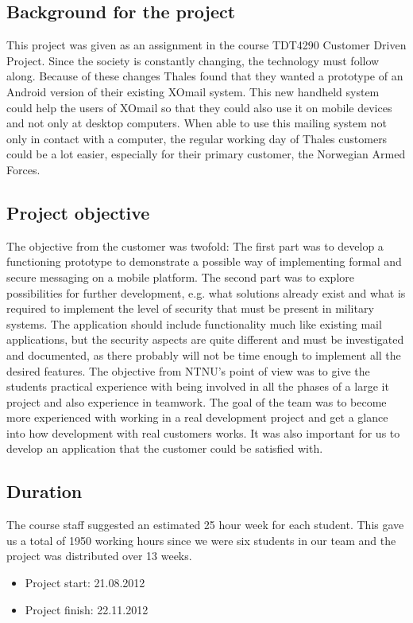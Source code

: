 \subsection{Background for the project}
This project was given as an assignment in the course TDT4290 Customer Driven Project. Since the society is constantly changing, the technology must follow along. Because of these changes Thales found that they wanted a prototype of an Android version of their existing XOmail system. This new handheld system could help the users of XOmail so that they could also use it on mobile devices and not only at desktop computers. When able to use this mailing system not only in contact with a computer, the regular working day of Thales customers could be a lot easier, especially for their primary customer, the Norwegian Armed Forces.

\newpage

\subsection{Project objective}
The objective from the customer was twofold: The first part was to develop a functioning prototype to demonstrate a possible way of implementing formal and secure messaging on a mobile platform. The second part was to explore possibilities for further development, e.g. what solutions already exist and what is required to implement the level of security that must be present in military systems. The application should include functionality much like existing mail applications, but the security aspects are quite different and must be investigated and documented, as there probably will not be time enough to implement all the desired features.
\newline
\newline
The objective from NTNU’s point of view was to give the students practical experience with being involved in all the phases of a large \gls{it} project and also experience in teamwork. 
\newline
\newline
The goal of the team was to become more experienced with working in a real development project and get a glance into how development with real customers works. It was also important for us to develop an application that the customer could be satisfied with. 


\subsection{Duration}
The course staff suggested an estimated 25 hour week for each student. This gave us a total of 1950 working hours since we were six students in our team and the project was distributed over 13 weeks.

\begin{itemize}
\item{}Project start: 21.08.2012
\item{}Project finish: 22.11.2012
\end{itemize}

